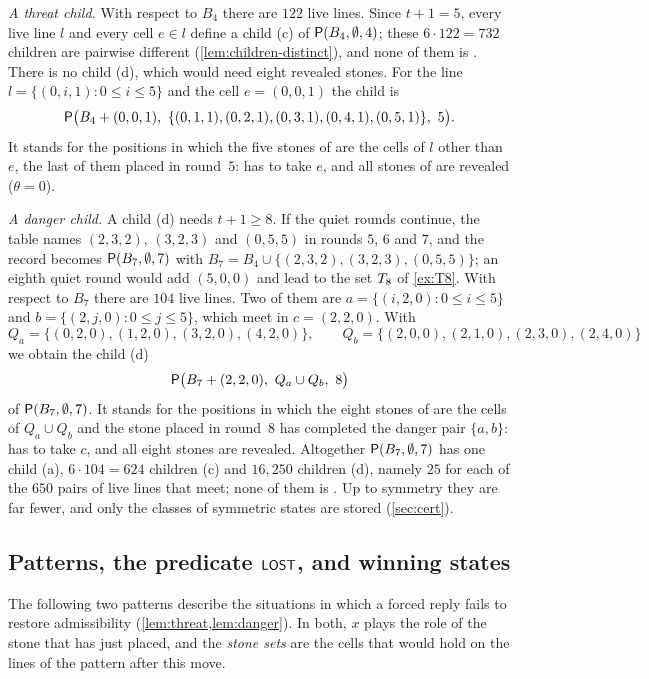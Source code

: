 \begin{example}
\smallskip\noindent\emph{A threat child.} With respect to $B_4$ there are $122$ live lines. Since $t+1=5$,
every live line $l$ and every cell $e\in l$ define a child \textup{(c)} of $\mathsf{P}(B_4,\emptyset,4)$; these
$6\cdot 122=732$ children are pairwise different (\cref{lem:children-distinct}), and none of them is \VOID.
There is no child \textup{(d)}, which would need eight revealed stones. For the line
$l=\{(0,i,1):0\le i\le 5\}$ and the cell $e=(0,0,1)$ the child is
\[ \Pst\bigl(B_4+(0,0,1),\ \{(0,1,1),(0,2,1),(0,3,1),(0,4,1),(0,5,1)\},\ 5\bigr). \]
It stands for the positions in which the five stones of \Maker{} are the cells of $l$ other than $e$, the
last of them placed in round~$5$: \Breaker{} has to take $e$, and all stones of \Maker{} are revealed
($\theta=0$).

\smallskip\noindent\emph{A danger child.} A child \textup{(d)} needs $t+1\ge 8$. If the quiet rounds
continue, the table names $(2,3,2)$, $(3,2,3)$ and $(0,5,5)$ in rounds $5$, $6$ and $7$, and the record
becomes $\mathsf{P}(B_7,\emptyset,7)$ with $B_7=B_4\cup\{(2,3,2),(3,2,3),(0,5,5)\}$; an eighth quiet round would add
$(5,0,0)$ and lead to the set $T_8$ of \cref{ex:T8}. With respect to $B_7$ there are $104$ live lines.
Two of them are $a=\{(i,2,0):0\le i\le 5\}$ and $b=\{(2,j,0):0\le j\le 5\}$, which meet in $c=(2,2,0)$. With
\[ Q_a=\{(0,2,0),(1,2,0),(3,2,0),(4,2,0)\},\qquad Q_b=\{(2,0,0),(2,1,0),(2,3,0),(2,4,0)\} \]
we obtain the child \textup{(d)}
\[ \Pst\bigl(B_7+(2,2,0),\ Q_a\cup Q_b,\ 8\bigr) \]
of $\mathsf{P}(B_7,\emptyset,7)$. It stands for the positions in which the eight stones of \Maker{} are the cells
of $Q_a\cup Q_b$ and the stone placed in round~$8$ has completed the danger pair $\{a,b\}$: \Breaker{} has
to take $c$, and all eight stones are revealed. Altogether $\mathsf{P}(B_7,\emptyset,7)$ has one child
\textup{(a)}, $6\cdot 104=624$ children \textup{(c)} and $16{,}250$ children \textup{(d)}, namely $25$ for each
of the $650$ pairs of live lines that meet; none of them is \VOID. Up to symmetry they are far fewer, and
only the classes of symmetric states are stored (\cref{sec:cert}).
\end{example}

\subsection{Patterns, the predicate \texorpdfstring{$\mathsf{LOST}$}{LOST}, and winning states}\label{sec:won}

The following two patterns describe the situations in which a forced reply fails to restore admissibility
(\cref{lem:threat,lem:danger}). In both, $x$ plays the role of the stone that \Maker{} has
just placed, and the \emph{stone sets} are the cells that \Maker{} would hold on the lines of the pattern
after this move.

